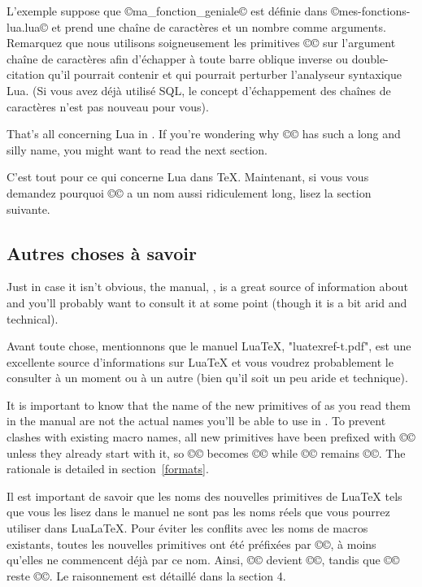 \documentclass{lltxdoc}
\begin{document}
L'exemple suppose que ©ma_fonction_geniale© est définie dans ©mes-fonctions-lua.lua© et prend une chaîne de caractères et un nombre comme arguments. Remarquez que nous utilisons soigneusement les primitives ©\luatexluaescapestring© sur l'argument chaîne de caractères afin d'échapper à toute barre oblique inverse ou double-citation qu'il pourrait contenir et qui pourrait perturber l'analyseur syntaxique Lua. (Si vous avez déjà utilisé SQL, le concept d'échappement des chaînes de caractères n'est pas nouveau pour vous).

\medskip

That's all concerning Lua in \tex. If you're wondering why
©\luatexluaescapestring© has such a long and silly name, you might want to
read the next section.

C'est tout pour ce qui concerne Lua dans TeX. Maintenant, si vous vous demandez pourquoi ©\luatexluaescapestring© a un nom aussi ridiculement long, lisez la section suivante.

\subsection{Autres choses à savoir}\label{things}

Just in case it isn't obvious, the \luatex manual, , is
a great source of information about \luatex and you'll probably want to
consult it at some point (though it is a bit arid and technical).

Avant toute chose, mentionnons que le manuel LuaTeX, "luatexref-t.pdf", est une excellente source d'informations sur LuaTeX et vous voudrez probablement le consulter à un moment ou à un autre (bien qu'il soit un peu aride et technique).

It is important to know that the name of the new primitives of \luatex as you
read them in the manual are not the actual names you'll be able to use in
\lualatex. To prevent clashes with existing macro names, all new primitives
have been prefixed with ©\luatex© unless they already start with it, so
©\luaescapestring© becomes ©\luatexluaescapetring© while ©\luatexversion©
remains ©\luatexversion©. The rationale is detailed in section~\ref{formats}.

Il est important de savoir que les noms des nouvelles primitives de LuaTeX tels que vous les lisez dans le manuel ne sont pas les noms réels que vous pourrez utiliser dans LuaLaTeX. Pour éviter les conflits avec les noms de macros existants, toutes les nouvelles primitives ont été préfixées par ©\luatex©, à moins qu'elles ne commencent déjà par ce nom. Ainsi, ©\luaescapestring© devient ©\luatexluaescapetring©, tandis que ©\luatexversion© reste ©\luatexversion©. Le raisonnement est détaillé dans la section 4.
\end{document}
